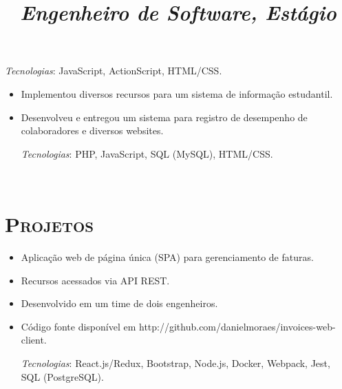 \begin{resume}
\begin{position}
\begin{itemize}
\vspace{1mm}
{\small \emph{Tecnologias}: JavaScript, ActionScript, HTML/CSS\@.}
\end{itemize}
\end{position}

\title{\emph{Engenheiro de Software, Est\'agio}}
\begin{position}
\vspace{1mm}
\begin{itemize}\small
\item Implementou diversos recursos para um sistema de informa\c{c}\~ao estudantil.
\item Desenvolveu e entregou um sistema para registro de desempenho de colaboradores e diversos websites.

\vspace{1mm}
{\small \emph{Tecnologias}: PHP, JavaScript, SQL (MySQL), HTML/CSS\@.}
\end{itemize}
\end{position}


\begin{formatb}
  \\
\end{formatb}

\section{\textsc{Projetos}}


\begin{position}
\vspace{1mm}
\begin{itemize}\small
\item Aplica\c{c}\~ao web de p\'agina \'unica (SPA) para gerenciamento de faturas.
\item Recursos acessados via API REST\@.
\item Desenvolvido em um time de dois engenheiros.
\item C\'odigo fonte dispon\'ivel em http://github.com/danielmoraes/invoices-web-client.

\vspace{1mm}
{\small \emph{Tecnologias}: React.js/Redux, Bootstrap, Node.js, Docker, Webpack, Jest, SQL (PostgreSQL).}
\end{itemize}
\end{position}


\end{resume}
